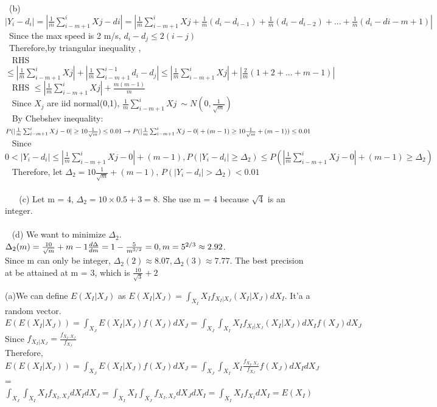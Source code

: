 \documentclass[11pt]{article}
\newenvironment{problem}[2][Problem]{\begin{trivlist}
\item[\hskip \labelsep {\bfseries #1}\hskip \labelsep {\bfseries #2.}]}{\end{trivlist}}
\begin{document}
 (b) $|Y_i - d_i| = |\frac{1}{m} \sum_{i-m+1}^{i} Xj - di |= |\frac{1}{m}  \sum_{i-m+1}^{i} Xj + \frac{1}{m}(d_i - d_{i-1}) + \frac{1}{m} (d_i - d_{i-2}) + ... + \frac{1}{m} (d_i - d{i-m+1})|$\\
 Since the max speed is 2 m/s, $d_i - d_j \leq 2(i-j)$\\
 Therefore,by triangular inequality ,\\
  RHS $\leq  | \frac{1}{m}\sum_{i-m+1}^{i} Xj| + | \frac{1}{m} \sum_{i-m+1}^{i-1} d_i - d_{j} |  \leq  |\frac{1}{m}\sum_{i-m+1}^{i} Xj| + |\frac{2}{m}(1 + 2 +... +m-1)|$\\
  RHS $\leq |\frac{1}{m}\sum_{i-m+1}^{i} Xj| + \frac{m(m-1)}{m}$\\
  Since $X_j$ are iid normal(0,1), $\frac{1}{m}\sum_{i-m+1}^{i} Xj ~\sim N(0, \frac{1}{\sqrt{m}})$\\
  By Chebshev inequality: $P(|\frac{1}{m}\sum_{i-m+1}^{i} Xj - 0| \geq 10 \frac{1}{\sqrt{m}} )\leq 0.01\\ \to P(|\frac{1}{m}\sum_{i-m+1}^{i} Xj - 0| + (m-1) \geq 10 \frac{1}{\sqrt{m}} +(m-1)) \leq 0.01$ \\
  Since $0 < |Y_i - d_i |\leq|\frac{1}{m}\sum_{i-m+1}^{i} Xj - 0| + (m-1), P(|Y_i - d_i| \geq \Delta_2) \leq P(|\frac{1}{m}\sum_{i-m+1}^{i} Xj - 0| + (m-1) \geq \Delta_2) $\\ 
  Therefore, let $\Delta_2 = 10 \frac{1}{\sqrt{m}} +(m-1)$, $P(|Y_i - d_i| > \Delta_2 ) < 0.01$\\
  \\
 
  (c) Let m = 4, $\Delta_2 = 10\times 0.5+3 = 8$. She use m = 4 because $\sqrt{4}$ is an integer.\\ 
  \\
  
  (d) We want to minimize $\Delta_2$. $\Delta_2(m) = \frac{10}{\sqrt{m}} + m-1\\
  \frac{d \Delta}{dm} = 1- \frac{5}{m^{3/2}} = 0, m = 5^{2/3} \approx 2.92$.\\
  Since m can only be integer, $\Delta_2(2) \approx 8.07, \Delta_2(3) \approx 7.77$. The best precision at be attained at m = 3, which is $\frac{10}{\sqrt{3}} + 2$\\

  
 \pagebreak
  
  \begin{problem}{5}
  \end{problem}
  (a)We can define $E(X_I| X_J)$ as  $E(X_I| X_J) = \int_{X_I} X_I f_{X_I|X_J}(X_I|X_J)d X_I$. It'a a random vector.\\
  $E(E(X_I| X_J)) = \int_{X_J} E(X_I| X_J) f(X_J)dX_J =  \int_{X_J} \int_{X_I} X_I f_{X_I|X_J}(X_I|X_J)d X_If(X_J)dX_J$\\
  Since $f_{X_I|X_J} = \frac{f_{X_I,X_J}}{f_{X_J}}$\\
  Therefore, $E(E(X_I| X_J)) = \int_{X_J} E(X_I| X_J) f(X_J)dX_J =  \int_{X_J} \int_{X_I} X_I \frac{f_{X_I,X_J}}{f_{X_J}} f(X_J) d X_IdX_J$\\
   = $\int_{X_J} \int_{X_I} X_I f_{X_I,X_J} d X_IdX_J =  \int_{X_I}X_I \int_{X_J}  f_{X_I,X_J} d X_JdX_I = \int_{X_I} X_I f_{X_I} dX_I  =E(X_I)$\\
   
\end{document}
